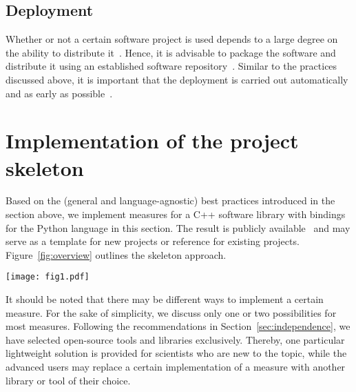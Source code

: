 \documentclass[@CLASSOPTIONS@]{tumarticle}
\begin{document}
\subsection{Deployment}

Whether or not a certain software project is used depends to a large degree
on the ability to distribute it~\cite{bangerth2013}. Hence, it is
advisable to package the software and distribute it using an established
software repository~\cite{nowogrodzki2019}. Similar to the practices
discussed above, it is important that the deployment is carried out
automatically and as early as possible~\cite{prlic2012}.

\section{Implementation of the project skeleton}
\label{sec:implementation}

Based on the (general and language-agnostic) best practices introduced in
the section above, we implement measures for a C++ software library with
bindings for the Python language in this section. The result is publicly
available~\cite{bertha} and may serve as a template for new projects or
reference for existing projects. Figure~\ref{fig:overview} outlines the
skeleton approach.

\begin{figure*}[tb]
  \centering
  \texttt{[image: fig1.pdf]}
  \caption{Overview of the project skeleton. The source code and
    dependencies of a scientific software project are denoted in orange.
    These are the parts the developer has to provide. The presented
    skeleton guides the project from creation to deployment. Here, the
    arrows denote jobs that are created by the CMake build system. These
    jobs are triggered during the different continuous integration stages
    (build, tests, quality, deploy) or (in the case of the dashed arrows)
    by the conda-forge build service that follows the
    recipe~\cite{bertha-feedstock}.
    The job names indicate the tools in use, where CXX represents one of
    the C++ compilers that are supported by CMake.}
  \label{fig:overview}
\end{figure*}

It should be noted that there may be different ways to implement a certain
measure. For the sake of simplicity, we discuss only one or two
possibilities for most measures. Following the recommendations in
Section~\ref{sec:independence}, we have selected open-source tools and
libraries exclusively. Thereby, one particular lightweight solution is
provided for scientists who are new to the topic, while the advanced users
may replace a certain implementation of a measure with another library or
tool of their choice.
\end{document}
